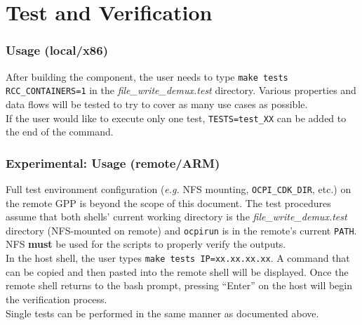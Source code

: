 \section*{Test and Verification}

\subsubsection*{Usage (local/x86)}
After building the component, the user needs to type \verb+make tests RCC_CONTAINERS=1+ in the \textit{file\_write\_demux.test} directory. Various properties and data flows will be tested to try to cover as many use cases as possible. \\

If the user would like to execute only one test, \verb+TESTS=test_XX+ can be added to the end of the command.

\subsubsection*{\textbf{Experimental}: Usage (remote/ARM)}
Full test environment configuration (\textit{e.g.} NFS mounting, \verb+OCPI_CDK_DIR+, etc.) on the remote GPP is beyond the scope of this document. The test procedures assume that both shells' current working directory is the \textit{file\_write\_demux.test} directory (NFS-mounted on remote) and \verb+ocpirun+ is in the remote's current \verb+PATH+. NFS \textbf{must} be used for the scripts to properly verify the outputs. \\

In the host shell, the user types \verb+make tests IP=xx.xx.xx.xx+. A command that can be copied and then pasted into the remote shell will be displayed. Once the remote shell returns to the bash prompt, pressing ``Enter'' on the host will begin the verification process. \\

Single tests can be performed in the same manner as documented above.

